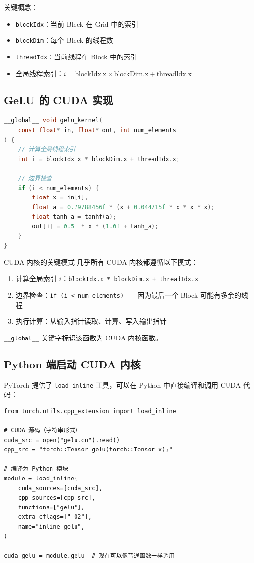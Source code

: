 \documentclass[a4paper]{article}
\begin{document}
关键概念：
\begin{itemize}
    \item \texttt{blockIdx}：当前 Block 在 Grid 中的索引
    \item \texttt{blockDim}：每个 Block 的线程数
    \item \texttt{threadIdx}：当前线程在 Block 中的索引
    \item 全局线程索引：$i = \text{blockIdx.x} \times \text{blockDim.x} + \text{threadIdx.x}$
\end{itemize}

\subsection{GeLU 的 CUDA 实现}

\begin{lstlisting}[caption={GeLU CUDA 内核（gelu.cu）},language=C]
__global__ void gelu_kernel(
    const float* in, float* out, int num_elements
) {
    // 计算全局线程索引
    int i = blockIdx.x * blockDim.x + threadIdx.x;

    // 边界检查
    if (i < num_elements) {
        float x = in[i];
        float a = 0.79788456f * (x + 0.044715f * x * x * x);
        float tanh_a = tanhf(a);
        out[i] = 0.5f * x * (1.0f + tanh_a);
    }
}
\end{lstlisting}

\begin{knowledgebox}{CUDA 内核的关键模式}
几乎所有 CUDA 内核都遵循以下模式：
\begin{enumerate}
    \item 计算全局索引 $i$：\texttt{blockIdx.x * blockDim.x + threadIdx.x}
    \item 边界检查：\texttt{if (i < num\_elements)}——因为最后一个 Block 可能有多余的线程
    \item 执行计算：从输入指针读取、计算、写入输出指针
\end{enumerate}
\texttt{\_\_global\_\_} 关键字标识该函数为 CUDA 内核函数。
\end{knowledgebox}

\subsection{Python 端启动 CUDA 内核}

PyTorch 提供了 \texttt{load\_inline} 工具，可以在 Python 中直接编译和调用 CUDA 代码：

\begin{lstlisting}[caption={在 Python 中编译和使用 CUDA 代码}]
from torch.utils.cpp_extension import load_inline

# CUDA 源码（字符串形式）
cuda_src = open("gelu.cu").read()
cpp_src = "torch::Tensor gelu(torch::Tensor x);"

# 编译为 Python 模块
module = load_inline(
    cuda_sources=[cuda_src],
    cpp_sources=[cpp_src],
    functions=["gelu"],
    extra_cflags=["-O2"],
    name="inline_gelu",
)

cuda_gelu = module.gelu  # 现在可以像普通函数一样调用
\end{lstlisting}
\end{document}
